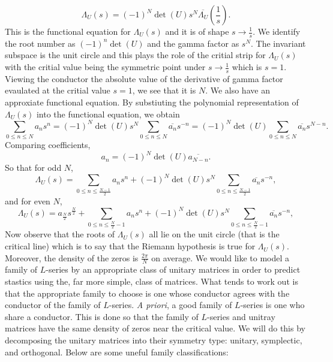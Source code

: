 \documentclass[12pt]{book}
\theoremstyle{definition}\newframedtheorem{method}{Method}
\renewcommand{\L}{\Lambda}
\newcommand{\<}{\langle}
\renewcommand{\>}{\rangle}
\newcommand{\conj}{\overline}
\begin{document}
        \[
          \L_{U}(s) = (-1)^{N}\det(U)s^{N}\conj{\L_{U}}\left(\frac{1}{s}\right).
        \]
        This is the functional equation for $\L_{U}(s)$ and it is of shape $s \to \frac{1}{s}$. We identify the root number as $(-1)^{n}\det(U)$ and the gamma factor as $s^{N}$. The invariant subspace is the unit circle and this plays the role of the critial strip for $\L_{U}(s)$ with the critial value being the symmetric point under $s \to \frac{1}{s}$ which is $s = 1$. Viewing the conductor the absolute value of the derivative of gamma factor evaulated at the critial value $s = 1$, we see that it is $N$. We also have an approxiate functional equation. By substiuting the polynomial representation of $\L_{U}(s)$ into the functional equation, we obtain
        \[
          \sum_{0 \le n \le N}a_{n}s^{n} = (-1)^{N}\det(U)s^{N}\sum_{0 \le n \le N}\conj{a_{n}}s^{-n} = (-1)^{N}\det(U)\sum_{0 \le n \le N}\conj{a_{n}}s^{N-n}.
        \]
        Comparing coefficients,
        \[
          a_{n} = (-1)^{N}\det(U)\conj{a_{N-n}}.
        \]
        So that for odd $N$,
        \[
          \L_{U}(s) = \sum_{0 \le n \le \frac{N-1}{2}}a_{n}s^{n}+(-1)^{N}\det(U)s^{N}\sum_{0 \le n \le \frac{N-1}{2}}\conj{a_{n}}s^{-n},
        \]
        and for even $N$,
        \[
          \L_{U}(s) = a_{\frac{N}{2}}s^{\frac{N}{2}}+\sum_{0 \le n \le \frac{N}{2}-1}a_{n}s^{n}+(-1)^{N}\det(U)s^{N}\sum_{0 \le n \le \frac{N}{2}-1}\conj{a_{n}}s^{-n},
        \]
        Now observe that the roots of $\L_{U}(s)$ all lie on the unit circle (that is the critical line) which is to say that the Riemann hypothesis is true for $\L_{U}(s)$. Moreover, the density of the zeros is $\frac{2\pi}{N}$ on average. We would like to model a family of $L$-series by an appropriate class of unitary matrices in order to predict stastics using the, far more simple, class of matrices. What tends to work out is that the appropriate family to choose is one whose conductor agrees with the conductor of the family of $L$-series. \textit{A priori}, a good family of $L$-series is one who share a conductor. This is done so that the family of $L$-series and unitray matrices have the same density of zeros near the critical value. We will do this by decomposing the unitary matrices into their symmetry type: unitary, symplectic, and orthogonal. Below are some uneful family classifications:
\end{document}
